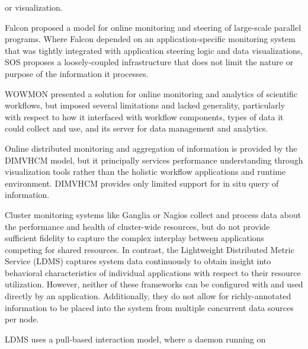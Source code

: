 or visualization.
%
\par
%
Falcon \cite{gu1995falcon} proposed a model for online monitoring
and steering of large-scale parallel programs.
%
Where Falcon depended on an application-specific monitoring system
that was tightly integrated with application steering logic and data
visualizations, SOS proposes a loosely-coupled infrastructure that
does not limit the nature or purpose of the information it processes.
%
\par
%
WOWMON \cite{zhang2016wowmon} presented a solution for online
monitoring and analytics of scientific workflows, but imposed several
limitations and lacked generality, particularly with respect to how it
interfaced with workflow components, types of data it could collect
and use, and its server for data management and analytics.
%
\par
%
Online distributed monitoring and aggregation of information is
provided by the DIMVHCM \cite{tesser2012dimvhcm} model, but it
principally services performance understanding through visualization
tools rather than the holistic workflow applications and runtime
environment.
%
DIMVHCM provides only limited support for in situ query of information.
%
\par
%
Cluster monitoring systems like Ganglia \cite{massie2004ganglia} or
Nagios \cite{katsaros2011building} collect and process data about the
performance and health of cluster-wide resources, but do not provide
sufficient fidelity to capture the complex interplay between
applications competing for shared resources.
%
In contrast, the Lightweight Distributed Metric Service
\cite{agelastos2014lightweight} (LDMS) captures system data
continuously to obtain insight into behavioral characteristics of
individual applications with respect to their resource utilization.
%
%
However, neither of these frameworks can be configured with and used
directly by an application.
%
Additionally, they do not allow for richly-annotated information to be
placed into the system from multiple concurrent data sources per node.
%
\par
%
%
LDMS uses a pull-based interaction model, where a daemon running on
